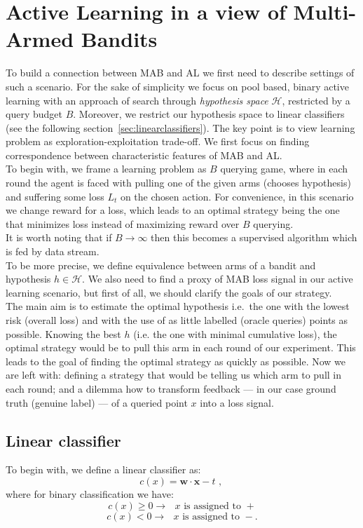 \documentclass[12pt, a4paper, pdflatex, leqno, twoside]{report}
\begin{document}
\section{Active Learning in a view of Multi-Armed Bandits}
To build a connection between MAB and AL we first need to describe settings of 
such a scenario. For the sake of simplicity we focus on pool based, binary active 
learning with an approach of search through \emph{hypothesis space} 
$\mathscr{H}$, restricted by a query budget $B$. Moreover, we restrict our 
hypothesis space to linear classifiers (see the following 
section~\ref{sec:linearclassifiers}). The key point is to view learning problem 
as exploration-exploitation trade-off. We first focus on finding 
correspondence between characteristic features of MAB and AL.\\

To begin with, we frame a learning problem as $B$ querying game, where in each round the agent is faced with pulling one 
of the given arms (chooses hypothesis) and suffering some loss $L_t$ on the chosen action. For convenience, in 
this scenario we change reward for a loss, which leads to an optimal strategy being 
the one that minimizes loss instead of maximizing reward over $B$ querying.\\

It is worth noting that if $B \rightarrow \infty$ then this becomes a supervised 
algorithm which is fed by data stream.\\

To be more precise, we define equivalence between arms of a bandit and 
hypothesis $\mathit{h} \in \mathscr{H}$. We also need to find a proxy of MAB 
loss signal in our active learning scenario, but first of all, we should clarify the goals of 
our strategy.\\
The main aim is to estimate the optimal hypothesis i.e.\ the one with the lowest risk 
(overall loss) and with the use of as little labelled (oracle queries) points as possible. Knowing the best 
$\mathit{h}$ (i.e. the one with minimal cumulative loss), the optimal strategy 
would be to pull this arm in each round of our experiment. This leads to the 
goal of finding the optimal strategy as quickly as possible. Now we are left with: 
defining a strategy that would be telling us which arm to pull in each round; and a dilemma how 
to transform feedback --- in our case ground truth (genuine label) --- of a
queried point $x$ into a loss signal.\\

\subsection{Linear classifier\label{sec:linearclassifiers}}
To begin with, we define a linear classifier as:
$$
c(x) = \mathbf{w} \cdot \mathbf{x} - t \text{~,~}
$$
where for binary classification we have:
$$
c(x) \geq 0 \rightarrow \text{ $x$ is assigned to $+$}
$$
$$
c(x) < 0 \rightarrow \text{ $x$ is assigned to $-$.}
$$\\
\end{document}
